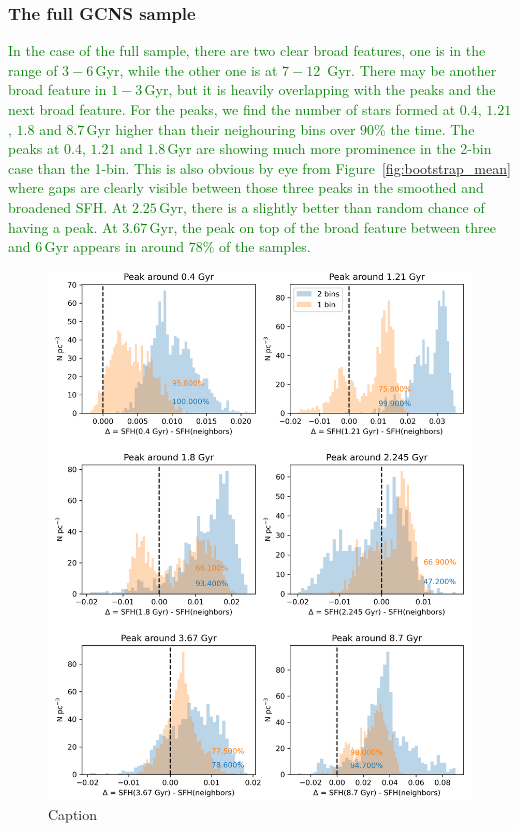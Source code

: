 \documentclass[fleqn,usenatbib]{mnras}
\begin{document}
\subsubsection{The full GCNS sample}
\textcolor{green}{
In the case of the full sample, there are two clear broad features, one is
in the range of $3-6$\,Gyr, while the other one is at $7-12$\, Gyr. There
may be another broad feature in $1-3$\,Gyr, but it is heavily overlapping
with the peaks and the next broad feature. For the peaks, we find the number
of stars formed at $0.4$, $1.21$, $1.8$ and $8.7$\,Gyr higher than their
neighouring bins over $90\%$ the time. The peaks at $0.4$, $1.21$ and
$1.8$\,Gyr are showing much more prominence in the 2-bin case than the 1-bin.
This is also obvious by eye from Figure~\ref{fig:bootstrap_mean} where
gaps are clearly visible between those three peaks in the smoothed and
broadened SFH. At $2.25$\,Gyr, there is a slightly better than random chance
of having a peak. At $3.67$\,Gyr, the peak on top of the broad feature
between three and $6$\,Gyr appears in around $78\%$ of the samples.
}
\begin{figure}
    \centering
    \includegraphics[width=\columnwidth]{figures/fig_07_sfh_peak_significance.png}
    \caption{Caption}
    \label{fig:full_sample_peaks}
\end{figure}
\end{document}

